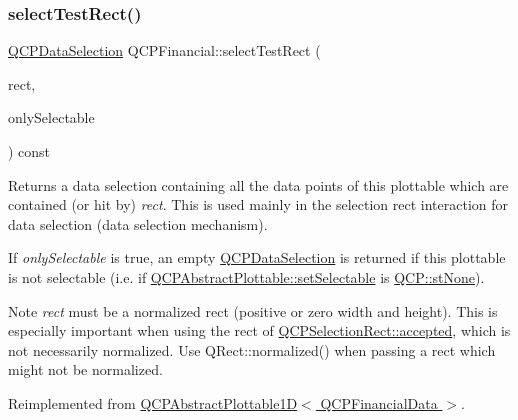 \mbox{\label{class_q_c_p_financial_a3c5beb1ab028a1dba845fc9dcffc7cf4}} 
\subsubsection{\texorpdfstring{select\+Test\+Rect()}{selectTestRect()}}
{\footnotesize\ttfamily \hyperlink{class_q_c_p_data_selection}{Q\+C\+P\+Data\+Selection} Q\+C\+P\+Financial\+::select\+Test\+Rect (\begin{DoxyParamCaption}\item[{const Q\+RectF \&}]{rect,  }\item[{bool}]{only\+Selectable }\end{DoxyParamCaption}) const\hspace{0.3cm}{\ttfamily [virtual]}}





Returns a data selection containing all the data points of this plottable which are contained (or hit by) {\itshape rect}. This is used mainly in the selection rect interaction for data selection (data selection mechanism).

If {\itshape only\+Selectable} is true, an empty \hyperlink{class_q_c_p_data_selection}{Q\+C\+P\+Data\+Selection} is returned if this plottable is not selectable (i.\+e. if \hyperlink{class_q_c_p_abstract_plottable_ac238d6e910f976f1f30d41c2bca44ac3}{Q\+C\+P\+Abstract\+Plottable\+::set\+Selectable} is \hyperlink{namespace_q_c_p_ac6cb9db26a564b27feda362a438db038aa64628e338a2dd1e6f0dc84dec0b63fe}{Q\+C\+P\+::st\+None}).

\begin{DoxyNote}{Note}
{\itshape rect} must be a normalized rect (positive or zero width and height). This is especially important when using the rect of \hyperlink{class_q_c_p_selection_rect_a15a43542e1f7b953a44c260b419e6d2c}{Q\+C\+P\+Selection\+Rect\+::accepted}, which is not necessarily normalized. Use {\ttfamily Q\+Rect\+::normalized()} when passing a rect which might not be normalized. 
\end{DoxyNote}


Reimplemented from \hyperlink{class_q_c_p_abstract_plottable1_d_a22377bf6e57ab7eedbc9e489250c6ded}{Q\+C\+P\+Abstract\+Plottable1\+D$<$ Q\+C\+P\+Financial\+Data $>$}.


